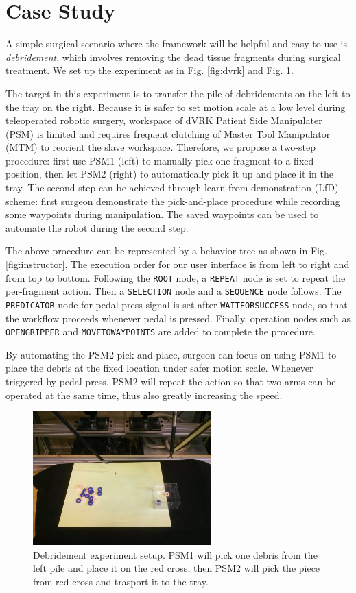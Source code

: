 \documentclass[letterpaper, 10 pt, conference]{ieeeconf}
\begin{document}
\section{Case Study}
A simple surgical scenario where the framework will be helpful and easy to use is \textit{debridement}, which involves removing the dead tissue fragments during surgical treatment. We set up the experiment as in Fig. \ref{fig:dvrk} and Fig. \ref{fig:debridement}. 

The target in this experiment is to transfer the pile of debridements  on the left to the tray on the right. Because it is safer to set motion scale at a low level during teleoperated robotic surgery, workspace of dVRK Patient Side Manipulater (PSM) is limited and requires frequent clutching of Master Tool Manipulator (MTM) to reorient the slave workspace. Therefore, we propose a two-step procedure: first use PSM1 (left) to manually pick one fragment to a fixed position, then let PSM2 (right) to automatically pick it up and place it in the tray. The second step can be achieved through learn-from-demonstration (LfD) scheme: first surgeon demonstrate the pick-and-place procedure while recording some waypoints during manipulation. The saved waypoints can be used to automate the robot during the second step. 

The above procedure can be represented by a behavior tree as shown in Fig. \ref{fig:instructor}. The execution order for our user interface is from left to right and from top to bottom. Following the \texttt{ROOT} node, a \texttt{REPEAT} node is set to repeat the per-fragment action. Then a \texttt{SELECTION} node and a \texttt{SEQUENCE} node follows. The \texttt{PREDICATOR} node for pedal press signal is set after \texttt{WAITFORSUCCESS} node, so that the workflow proceeds whenever pedal is pressed. Finally, operation nodes such as \texttt{OPENGRIPPER} and \texttt{MOVETOWAYPOINTS} are added to complete the procedure. 

By automating the PSM2 pick-and-place, surgeon can focus on using PSM1 to place the debris at the fixed location under safer motion scale. Whenever triggered by pedal press, PSM2 will repeat the action so that two arms can be operated at the same time, thus also greatly increasing the speed.  


\begin{figure}[bt]
\centering
\includegraphics[width=195pt]{debridement.jpg}
\caption{Debridement experiment setup. PSM1 will pick one debris from the left pile and place it on the red cross, then PSM2 will pick the piece from red cross and trasport it to the tray.}
\label{fig:debridement}
\end{figure}
\end{document}
